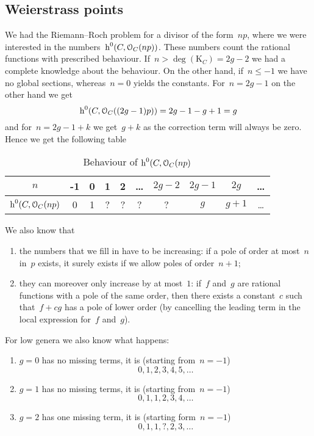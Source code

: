\subsection{Weierstrass points}
We had the Riemann--Roch problem for a divisor of the form~$np$, where we were interested in the numbers~$\operatorname{h}^0(C,\mathcal{O}_C(np))$. These numbers count the rational functions with prescribed behaviour. If~$n>\deg(\mathrm{K}_C)=2g-2$ we had a complete knowledge about the behaviour. On the other hand, if~$n\leq -1$ we have no global sections, whereas~$n=0$ yields the constants. For~$n=2g-1$ on the other hand we get
\begin{equation}
  \operatorname{h}^0(C,\mathcal{O}_C((2g-1)p))=2g-1-g+1=g
\end{equation}
and for~$n=2g-1+k$ we get~$g+k$ as the correction term will always be zero. Hence we get the following table
\begin{table}
  \centering
  \begin{tabular}{cccccccccc}
    $n$ & -1 & 0 & 1 & 2 & \dots & $2g-2$ & $2g-1$ & $2g$ & \dots \\\midrule
    $\operatorname{h}^0(C,\mathcal{O}_C(np)$ & 0 & 1 & ? & ? & ? & ? & $g$ & $g+1$ & \dots
  \end{tabular}
  \caption{Behaviour of $\operatorname{h}^0(C,\mathcal{O}_C(np)$}
  \label{table:np}
\end{table}
We also know that
\begin{enumerate}
  \item the numbers that we fill in have to be increasing: if a pole of order at most~$n$ in~$p$ exists, it surely exists if we allow poles of order~$n+1$;
  \item they can moreover only increase by at most~$1$: if~$f$ and~$g$ are rational functions with a pole of the same order, then there exists a constant~$c$ such that~$f+cg$ has a pole of lower order (by cancelling the leading term in the local expression for~$f$ and~$g$).
\end{enumerate}
For low genera we also know what happens:
\begin{enumerate}
  \item $g=0$ has no missing terms, it is (starting from~$n=-1$)
    \begin{equation}
      0, 1, 2, 3, 4, 5, \dotsc
    \end{equation}
  \item $g=1$ has no missing terms, it is (starting from~$n=-1$) 
    \begin{equation}
      0, 1, 1, 2, 3, 4, \dotsc
    \end{equation}
  \item $g=2$ has one missing term, it is (starting form~$n=-1$)
    \begin{equation}
      0, 1, 1, ? , 2, 3, \dotsc
    \end{equation}
\end{enumerate}
